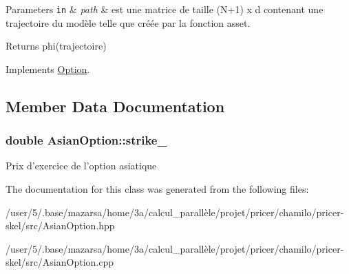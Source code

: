 \begin{DoxyParams}[1]{Parameters}
\mbox{\tt in}  & {\em path} & est une matrice de taille (N+1) x d contenant une trajectoire du modèle telle que créée par la fonction asset. \\
\hline
\end{DoxyParams}
\begin{DoxyReturn}{Returns}
phi(trajectoire) 
\end{DoxyReturn}


Implements \hyperlink{classOption_abe90882a11f5436077425249e3f32204}{Option}.



\subsection{Member Data Documentation}
\hypertarget{classAsianOption_a05e393157001728b21918c8342d7e7e1}{
\subsubsection[{strike\-\_\-}]{\setlength{\rightskip}{0pt plus 5cm}double Asian\-Option\-::strike\-\_\-}}\label{classAsianOption_a05e393157001728b21918c8342d7e7e1}
Prix d'exercice de l'option asiatique 

The documentation for this class was generated from the following files\-:\begin{DoxyCompactItemize}
\item 
/user/5/.\-base/mazarsa/home/3a/calcul\-\_\-parallèle/projet/pricer/chamilo/pricer-\/skel/src/Asian\-Option.\-hpp\item 
/user/5/.\-base/mazarsa/home/3a/calcul\-\_\-parallèle/projet/pricer/chamilo/pricer-\/skel/src/Asian\-Option.\-cpp\end{DoxyCompactItemize}
